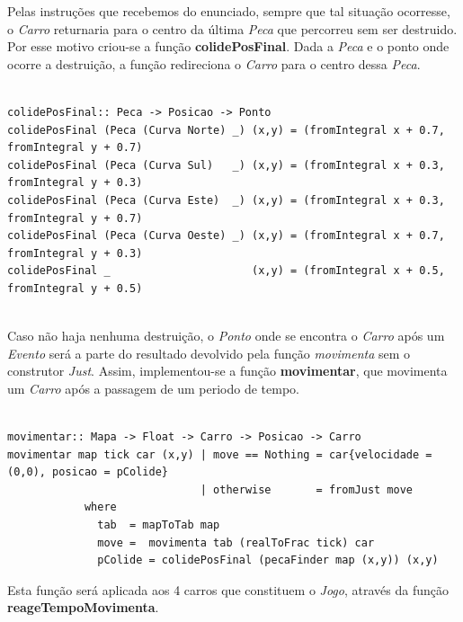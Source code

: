 \documentclass[a4paper]{report} %
\begin{document}
Pelas instruções que recebemos do enunciado, sempre que tal situação ocorresse, o \emph{Carro} returnaria para o centro da última \emph{Peca} que percorreu sem ser destruido. Por esse motivo criou-se a função \textbf{colidePosFinal}. Dada a \emph{Peca} e o ponto onde ocorre a destruição, a função redireciona o \emph{Carro} para o centro dessa \emph{Peca}.

\scriptsize

\begin{verbatim}

colidePosFinal:: Peca -> Posicao -> Ponto
colidePosFinal (Peca (Curva Norte) _) (x,y) = (fromIntegral x + 0.7, fromIntegral y + 0.7)  
colidePosFinal (Peca (Curva Sul)   _) (x,y) = (fromIntegral x + 0.3, fromIntegral y + 0.3)
colidePosFinal (Peca (Curva Este)  _) (x,y) = (fromIntegral x + 0.3, fromIntegral y + 0.7)
colidePosFinal (Peca (Curva Oeste) _) (x,y) = (fromIntegral x + 0.7, fromIntegral y + 0.3)
colidePosFinal _                      (x,y) = (fromIntegral x + 0.5, fromIntegral y + 0.5)                   
  
\end{verbatim}

\newpage


\normalsize

Caso não haja nenhuma destruição, o \emph{Ponto} onde se encontra o \emph{Carro} após um \emph{Evento} será a parte do resultado devolvido pela função \emph{movimenta} sem o construtor \emph{Just}.
Assim, implementou-se a função \textbf{movimentar}, que movimenta um \emph{Carro} após a passagem de um periodo de tempo.

\scriptsize

\begin{verbatim}

movimentar:: Mapa -> Float -> Carro -> Posicao -> Carro
movimentar map tick car (x,y) | move == Nothing = car{velocidade = (0,0), posicao = pColide}
                              | otherwise       = fromJust move
            where
              tab  = mapToTab map
              move =  movimenta tab (realToFrac tick) car
              pColide = colidePosFinal (pecaFinder map (x,y)) (x,y)

\end{verbatim} 

\normalsize

Esta função será aplicada aos 4 carros que constituem o \emph{Jogo}, através da função \textbf{reageTempoMovimenta}.

\scriptsize
\end{document}
